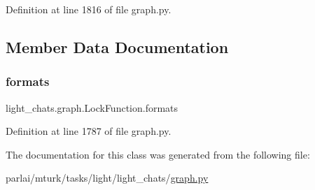 Definition at line 1816 of file graph.\+py.



\subsection{Member Data Documentation}
\mbox{\label{classlight__chats_1_1graph_1_1LockFunction_a5a4e9e70cf33889e84cc3d713cb3a270}} 
\subsubsection{\texorpdfstring{formats}{formats}}
{\footnotesize\ttfamily light\+\_\+chats.\+graph.\+Lock\+Function.\+formats}



Definition at line 1787 of file graph.\+py.



The documentation for this class was generated from the following file\+:\begin{DoxyCompactItemize}
\item 
parlai/mturk/tasks/light/light\+\_\+chats/\hyperlink{parlai_2mturk_2tasks_2light_2light__chats_2graph_8py}{graph.\+py}\end{DoxyCompactItemize}
